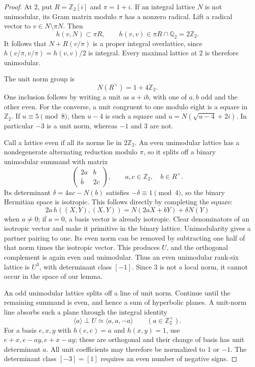 \documentclass[11pt]{article}
\theoremstyle{definition}
\theoremstyle{remark}
\begin{document}
\begin{proof}
At $2$, put $R=\mathbb Z_2[i]$ and $\pi=1+i$.
If an integral lattice $N$ is not unimodular, its Gram matrix modulo
$\pi$ has a nonzero radical.  Lift a radical vector to
$v\in N\setminus\pi N$.  Then
\[
 h(v,N)\subset\pi R,\qquad
 h(v,v)\in\pi R\cap\mathbb Q_2=2\mathbb Z_2.
\]
It follows that $N+R(v/\pi)$ is a proper integral overlattice, since
$h(v/\pi,v/\pi)=h(v,v)/2$ is integral.
Every maximal lattice at $2$ is therefore unimodular.

The unit norm group is
\[
 N(R^\times)=1+4\mathbb Z_2.
\]
One inclusion follows by writing a unit as $a+ib$, with one of $a,b$
odd and the other even.  For the converse, a unit congruent to one
modulo eight is a square in $\mathbb Z_2$.  If $u\equiv5\pmod8$,
then $u-4$ is such a square and
$u=N(\sqrt{u-4}+2i)$.
In particular $-3$ is a unit norm, whereas $-1$ and $3$ are not.

Call a lattice even if all its norms lie in $2\mathbb Z_2$.
An even unimodular lattice has a nondegenerate alternating reduction
modulo $\pi$, so it splits off a binary unimodular summand with matrix
\[
 \begin{pmatrix}2a&b\\\bar b&2c\end{pmatrix},
 \qquad a,c\in\mathbb Z_2,\quad b\in R^\times.
\]
Its determinant $\delta=4ac-N(b)$ satisfies $-\delta\equiv1\pmod4$,
so the binary Hermitian space is isotropic.  This follows directly by
completing the square:
\[
 2a\,h((X,Y),(X,Y))
   =N(2aX+bY)+\delta N(Y)
\]
when $a\ne0$; if $a=0$, a basis vector is already isotropic.
Clear denominators of an isotropic vector and make it primitive in the
binary lattice.  Unimodularity gives a partner pairing to one.
Its even norm can be removed by subtracting one half of that norm
times the isotropic vector.  This produces $U$, and the orthogonal
complement is again even and unimodular.  Thus an even unimodular
rank-six lattice is $U^3$, with determinant class $[-1]$.
Since $3$ is not a local norm, it cannot occur in the space of our lemma.

An odd unimodular lattice splits off a line of unit norm.  Continue
until the remaining summand is even, and hence a sum of hyperbolic
planes.  A unit-norm line absorbs such a plane through the integral
identity
\[
 \langle a\rangle\perp U\simeq\langle a,a,-a\rangle
 \qquad(a\in\mathbb Z_2^\times).
\]
For a basis $e,x,y$ with $h(e,e)=a$ and $h(x,y)=1$, use
$e+x,e-ay,e+x-ay$; these are orthogonal and their change of basis has
unit determinant $a$.  All unit coefficients may therefore be
normalized to $1$ or $-1$.  The determinant class $[-3]=[1]$ requires
an even number of negative signs.


\end{proof}
\end{document}
